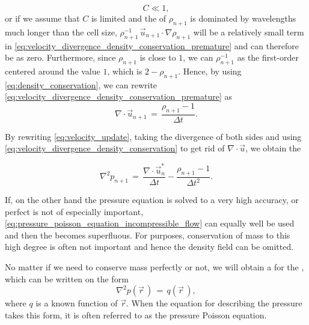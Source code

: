 %
\begin{equation}
C \ll 1,
\end{equation}
%
or if we assume that $C$ is limited and the \spectrum of $\rho_{n+1}$ is dominated by wavelengths much longer than the cell size, $\rho_{n+1}^{-1}\,\vec{u}_{n+1}\cdot\nabla\rho_{n+1}$ will be a relatively small term in \eqref{eq:velocity_divergence_density_conservation_premature} and can therefore be \approximated as zero. Furthermore, since $\rho_{n+1}$ is close to $1$, we can \approximate $\rho_{n+1}^{-1}$ as the first-order  centered around the value $1$, which is $2-\rho_{n+1}$. Hence, by using \eqref{eq:density_conservation}, we can rewrite \eqref{eq:velocity_divergence_density_conservation_premature} as
%
\begin{equation} \label{eq:velocity_divergence_density_conservation}
\nabla\cdot\vec{u}_{n+1} \,=\, \frac{\rho_{n+1}-1}{\Delta t}.
\end{equation}

By rewriting \eqref{eq:velocity_update}, taking the divergence of both sides and using \eqref{eq:velocity_divergence_density_conservation} to get rid of $\nabla\cdot\vec{u}$, we obtain the 

\begin{equation} \label{eq:pressure_poisson_equation_density_conservation}
\nabla^2 p_{n+1} \,=\, \frac{\nabla\cdot\vec{u}^*_n}{\Delta t} - \frac{\rho_{n+1} - 1}{\Delta t^2}.
\end{equation}

If, on the other hand the pressure equation is solved to a very high accuracy, or perfect  is not of especially important, \eqref{eq:pressure_poisson_equation_incompressible_flow} can equally well be used and then the  becomes superfluous. For \simulation purposes, conservation of mass to this high degree is often not important and hence the density field can be omitted.

No matter if we need to conserve mass perfectly or not, we will obtain a  for the , which can be written on the form
%
\begin{equation} \label{eq:pressure_poisson_equation_continuous}
\nabla^2 p(\vec{r}\,) \,=\, q(\vec{r}\,),
\end{equation}
%
where $q$ is a known function of $\vec{r}$. When the equation for describing the pressure takes this form, it is often referred to as the pressure Poisson equation.

